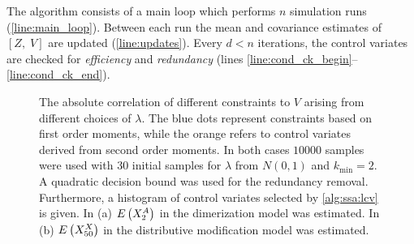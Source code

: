The algorithm consists of a main loop which performs $n$ simulation runs (\autoref{line:main_loop}).
Between each run the mean and covariance estimates of $[Z,\;  V]$ are updated (\autoref{line:updates}).
Every $d<n$ iterations, the control variates are checked for  \emph{efficiency}
and \emph{redundancy} (lines \ref{line:cond_ck_begin}--\ref{line:cond_ck_end}).
\begin{figure}[htb]
	\centering
	\caption[\ac{CV} correlation charactersitics]{The absolute correlation of different constraints {to $V$}
    arising from different choices of $\lambda$. The blue dots represent constraints
    based on first order moments, while the orange refers to control  variates derived from second
	order moments. In both cases $\num{10000}$ samples were used with
	\num{30} initial samples for $\lambda$ from $N(0,1)$ and $k_{\min}=2$. A quadratic decision bound was used for
    the redundancy removal. Furthermore, a histogram of control  variates selected by \autoref{alg:ssa:lcv}
    is given.
    In (a) ${E}\left(X^A_2\right)$ in the dimerization model was estimated.
    In (b) ${E}\left(X^X_{50}\right)$ in the distributive modification model was estimated.
    }
    \label{fig:bdim}
\end{figure}

